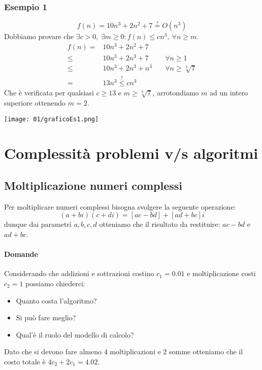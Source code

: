         \subsubsection{Esempio 1}
            $$
                f(n) = 10n^3 + 2n^2 + 7 \stackrel{?}{=} O(n^3)
            $$
            Dobbiamo provare che $ \exists c>0,\ \exists m\geq 0: f(n) \leq cn^3,\ \forall n\geq m $.
            $$
                \begin{aligned}
                    f(n) =& 10n^3 + 2n^2 + 7\\
                    \leq & 10n^3 + 2n^3 + 7 &\quad \forall n \geq 1\\ 
                    \leq & 10n^3 + 2n^3 + n^3 &\quad  \forall n \geq \sqrt[3]{7}\\
                    = & 13 n^3 \stackrel{?}{\leq} cn^3
                \end{aligned}
            $$
            Che è verificata per qualsiasi $ c \geq 13 $ e $ m \geq \sqrt[3]{7} $, arrotondiamo $m$ ad un intero superiore ottenendo $ m = 2 $. 
            
            \texttt{[image: 01/graficoEs1.png]}
\section{Complessità problemi v/s algoritmi}
    \subsection{Moltiplicazione numeri complessi}
        Per moltiplicare numeri complessi bisogna svolgere la seguente operazione:
        $$
            (a+bi)(c+di) = [ac-bd]+[ad+bc]i
        $$
        dunque dai parametri $ a,b,c,d $ otteniamo che il risultato da restituire: $ ac-bd $ e $ ad+bc $.
        \paragraph{Domande}
            Considerando che addizioni e sottrazioni costino $ c_1 = 0.01 $ e moltiplicazione costi $ c_2 = 1 $ possiamo chiederci:
            \begin{itemize}
                \item Quanto costa l'algoritmo?
                \item Si può fare meglio?
                \item Qual'è il ruolo del modello di calcolo?
            \end{itemize}
            Dato che si devono fare almeno 4 moltiplicazioni e 2 somme otteniamo che il costo totale è $ 4c_2 + 2c_1 = 4.02 $.
            
